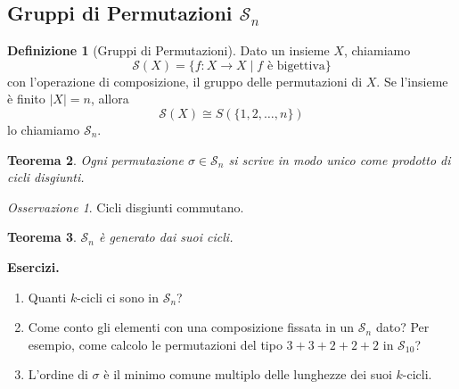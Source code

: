 \documentclass[a4paper]{article}
\newtheorem{theorem}{Teorema}[section]
\theoremstyle{remark}
\newtheorem*{remark}{Osservazione}
\theoremstyle{definition}
\newtheorem{definition}[theorem]{Definizione}
\begin{document}
\subsection{Gruppi di Permutazioni $ \mathcal{S}_n $}
\begin{multicols}{2}
\begin{definition}[Gruppi di Permutazioni]
	Dato un insieme $ X $, chiamiamo
	\[  \mathcal{S}(X) = \{ f: X \to X \mid f  \text{ è bigettiva}  \}  \]
	con l'operazione di composizione, il gruppo delle permutazioni di $ X $. Se l'insieme è finito $ |X| = n $, allora
	\[  \mathcal{S}(X) \cong S(\{ 1 ,2, \dots, n \})  \]
	lo chiamiamo $ \mathcal{S}_n $.
\end{definition}

\begin{theorem}
	Ogni permutazione $ \sigma \in \mathcal{S}_n $ si scrive in modo unico come prodotto di cicli disgiunti.
\end{theorem}
\begin{remark}
	Cicli disgiunti commutano.
\end{remark}


\begin{theorem}
	$ \mathcal{S}_n $ è generato dai suoi cicli.
\end{theorem}

\textbf{Esercizi.}
\begin{enumerate}
	\item Quanti $ k $-cicli ci sono in $ \mathcal{S}_n $?
	\item Come conto gli elementi con una composizione fissata in un $ \mathcal{S}_n $ dato? Per esempio, come calcolo le permutazioni del tipo $ 3+3+2+2+2 $ in $ \mathcal{S}_{10} $?
	\item L'ordine di $ \sigma $ è il minimo comune multiplo delle lunghezze dei suoi $ k $-cicli.
\end{enumerate}


\end{multicols}
\end{document}
